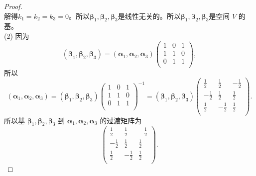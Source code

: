 \begin{enumerate}[1~]
\begin{proof}
\[\]
解得$k_1 = k_2 = k_3 = 0$。所以$\boldsymbol { \boldsymbol{\beta} }_1, \boldsymbol { \boldsymbol{\beta} }_2, \boldsymbol { \boldsymbol{\beta} }_3$是线性无关的。所以$\boldsymbol { \boldsymbol{\beta} }_1, \boldsymbol { \boldsymbol{\beta} }_2, \boldsymbol { \boldsymbol{\beta} }_3$是空间 $V$ 的基。\\
(2) 因为\[
\left( \boldsymbol { \boldsymbol{\beta} }_1, \boldsymbol { \boldsymbol{\beta} }_2, \boldsymbol { \boldsymbol{\beta} }_3 \right) =\left( \boldsymbol { \boldsymbol{\alpha} } _1,\boldsymbol { \boldsymbol{\alpha} } _2,\boldsymbol { \boldsymbol{\alpha} } _3 \right) \left( \begin{matrix}
	1&		0&		1\\
	1&		1&		0\\
	0&		1&		1\\
\end{matrix} \right) ,
\]
所以\[
\left( \boldsymbol { \boldsymbol{\alpha} } _1,\boldsymbol { \boldsymbol{\alpha} } _2,\boldsymbol { \boldsymbol{\alpha} } _3 \right) =\left( \boldsymbol { \boldsymbol{\beta} }_1, \boldsymbol { \boldsymbol{\beta} }_2, \boldsymbol { \boldsymbol{\beta} }_3 \right) \left( \begin{matrix}
	1&		0&		1\\
	1&		1&		0\\
	0&		1&		1\\
\end{matrix} \right) ^{-1}=\left( \boldsymbol { \boldsymbol{\beta} }_1, \boldsymbol { \boldsymbol{\beta} }_2, \boldsymbol { \boldsymbol{\beta} }_3 \right) \left( \begin{matrix}
	\frac{1}{2}&		\frac{1}{2}&		-\frac{1}{2}\\
	-\frac{1}{2}&		\frac{1}{2}&		\frac{1}{2}\\
	\frac{1}{2}&		-\frac{1}{2}&		\frac{1}{2}\\
\end{matrix} \right) .
\]
所以基 $\boldsymbol { \boldsymbol{\beta} }_1, \boldsymbol { \boldsymbol{\beta} }_2, \boldsymbol { \boldsymbol{\beta} }_3$ 到 $\boldsymbol { \boldsymbol{\alpha} }_1, \boldsymbol { \boldsymbol{\alpha} }_2, \boldsymbol { \boldsymbol{\alpha} }_3$ 的过渡矩阵为\[
\left( \begin{matrix}
	\frac{1}{2}&		\frac{1}{2}&		-\frac{1}{2}\\
	-\frac{1}{2}&		\frac{1}{2}&		\frac{1}{2}\\
	\frac{1}{2}&		-\frac{1}{2}&		\frac{1}{2}\\
\end{matrix} \right).
\]

\end{proof}
\end{enumerate}

